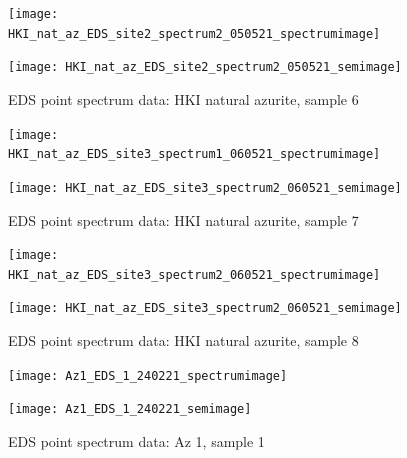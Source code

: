 \begin{figure}[H]
\centering
\begin{minipage}{.45\textwidth}
  \centering
  \texttt{[image: HKI\_nat\_az\_EDS\_site2\_spectrum2\_050521\_spectrumimage]}
\end{minipage}
\begin{minipage}{.45\textwidth}
  \centering
  \texttt{[image: HKI\_nat\_az\_EDS\_site2\_spectrum2\_050521\_semimage]}
\end{minipage}
\caption[EDS point spectrum data: HKI natural azurite, sample 6]{EDS point spectrum data: HKI natural azurite, sample 6}
\label{fig:hki_point_eds_6}
\end{figure}

\begin{figure}[H]
\centering
\begin{minipage}{.45\textwidth}
  \centering
  \texttt{[image: HKI\_nat\_az\_EDS\_site3\_spectrum1\_060521\_spectrumimage]}
\end{minipage}
\begin{minipage}{.45\textwidth}
  \centering
  \texttt{[image: HKI\_nat\_az\_EDS\_site3\_spectrum2\_060521\_semimage]}
\end{minipage}
\caption[EDS point spectrum data: HKI natural azurite, sample 7]{EDS point spectrum data: HKI natural azurite, sample 7}
\label{fig:hki_point_eds_7}
\end{figure}

\begin{figure}[H]
\centering
\begin{minipage}{.45\textwidth}
  \centering
  \texttt{[image: HKI\_nat\_az\_EDS\_site3\_spectrum2\_060521\_spectrumimage]}
\end{minipage}
\begin{minipage}{.45\textwidth}
  \centering
  \texttt{[image: HKI\_nat\_az\_EDS\_site3\_spectrum2\_060521\_semimage]}
\end{minipage}
\caption[EDS point spectrum data: HKI natural azurite, sample 8]{EDS point spectrum data: HKI natural azurite, sample 8}
\label{fig:hki_point_eds_8}
\end{figure}




\begin{figure}[H]
\centering
\begin{minipage}{.45\textwidth}
  \centering
  \texttt{[image: Az1\_EDS\_1\_240221\_spectrumimage]}
\end{minipage}
\begin{minipage}{.45\textwidth}
  \centering
  \texttt{[image: Az1\_EDS\_1\_240221\_semimage]}
\end{minipage}
\caption[EDS point spectrum data: Az 1, sample 1]{EDS point spectrum data: Az 1, sample 1}
\label{fig:az1_point_eds_1}
\end{figure}

